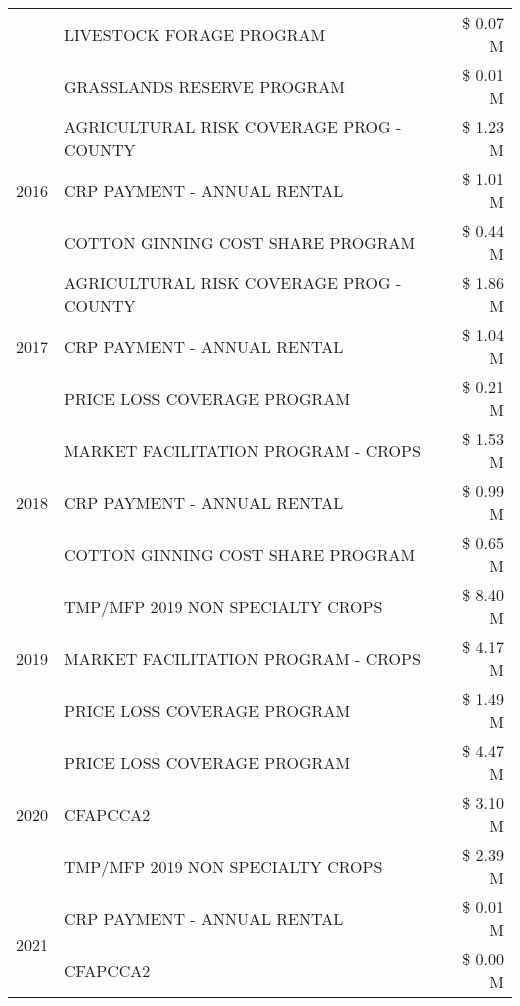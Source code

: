 \begin{tabular}{llr}
 & LIVESTOCK FORAGE PROGRAM & \$ 0.07 M \\
 & GRASSLANDS RESERVE PROGRAM & \$ 0.01 M \\
\cline{1-3}
\multirow[t]{3}{*}{2016} & AGRICULTURAL RISK COVERAGE PROG - COUNTY & \$ 1.23 M \\
 & CRP PAYMENT - ANNUAL RENTAL & \$ 1.01 M \\
 & COTTON GINNING COST SHARE PROGRAM & \$ 0.44 M \\
\cline{1-3}
\multirow[t]{3}{*}{2017} & AGRICULTURAL RISK COVERAGE PROG - COUNTY & \$ 1.86 M \\
 & CRP PAYMENT - ANNUAL RENTAL & \$ 1.04 M \\
 & PRICE LOSS COVERAGE PROGRAM & \$ 0.21 M \\
\cline{1-3}
\multirow[t]{3}{*}{2018} & MARKET FACILITATION PROGRAM - CROPS & \$ 1.53 M \\
 & CRP PAYMENT - ANNUAL RENTAL & \$ 0.99 M \\
 & COTTON GINNING COST SHARE PROGRAM & \$ 0.65 M \\
\cline{1-3}
\multirow[t]{3}{*}{2019} & TMP/MFP 2019 NON SPECIALTY CROPS & \$ 8.40 M \\
 & MARKET FACILITATION PROGRAM - CROPS & \$ 4.17 M \\
 & PRICE LOSS COVERAGE PROGRAM & \$ 1.49 M \\
\cline{1-3}
\multirow[t]{3}{*}{2020} & PRICE LOSS COVERAGE PROGRAM & \$ 4.47 M \\
 & CFAPCCA2 & \$ 3.10 M \\
 & TMP/MFP 2019 NON SPECIALTY CROPS & \$ 2.39 M \\
\cline{1-3}
\multirow[t]{2}{*}{2021} & CRP PAYMENT - ANNUAL RENTAL & \$ 0.01 M \\
 & CFAPCCA2 & \$ 0.00 M \\
\cline{1-3}
\bottomrule
\end{tabular}
